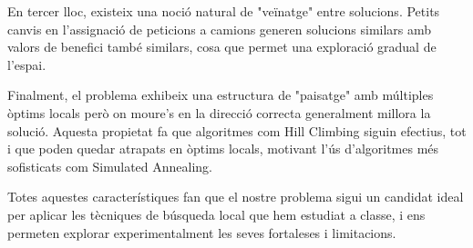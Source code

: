 En tercer lloc, existeix una noció natural de "veïnatge" entre solucions. Petits canvis en l'assignació de peticions a camions generen solucions similars amb valors de benefici també similars, cosa que permet una exploració gradual de l'espai.

Finalment, el problema exhibeix una estructura de "paisatge" amb múltiples òptims locals però on moure's en la direcció correcta generalment millora la solució. Aquesta propietat fa que algoritmes com Hill Climbing siguin efectius, tot i que poden quedar atrapats en òptims locals, motivant l'ús d'algoritmes més sofisticats com Simulated Annealing.

Totes aquestes característiques fan que el nostre problema sigui un candidat ideal per aplicar les tècniques de búsqueda local que hem estudiat a classe, i ens permeten explorar experimentalment les seves fortaleses i limitacions.